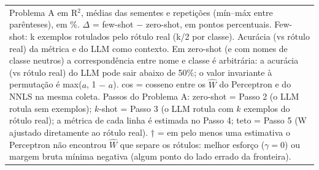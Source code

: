 \begin{table}[htbp]
\begin{tabular}{llrrrrrrrrrrr}
\multicolumn{13}{p{0.95\linewidth}}{\footnotesize Problema A em R$^2$, médias das sementes e repetições (mín–máx entre parênteses), em \%. $\Delta$ = few-shot $-$ zero-shot, em pontos percentuais. Few-shot: k exemplos rotulados pelo rótulo real (k/2 por classe). Acurácia (vs rótulo real) da métrica e do LLM como contexto. Em zero-shot (e com nomes de classe neutros) a correspondência entre nome e classe é arbitrária: a acurácia (vs rótulo real) do LLM pode sair abaixo de 50\%; o valor invariante à permutação é max($a$, 1 $-$ $a$). cos = cosseno entre os $\hat{W}$ do Perceptron e do NNLS na mesma coleta. Passos do Problema A: zero-shot = Passo 2 (o LLM rotula sem exemplos); $k$-shot = Passo 3 (o LLM rotula com $k$ exemplos do rótulo real); a métrica de cada linha é estimada no Passo 4; teto = Passo 5 (W ajustado diretamente ao rótulo real). † = em pelo menos uma estimativa o Perceptron não encontrou $\hat{W}$ que separe os rótulos: melhor esforço ($\gamma = 0$) ou margem bruta mínima negativa (algum ponto do lado errado da fronteira).} \\
\end{tabular}
\end{table}
